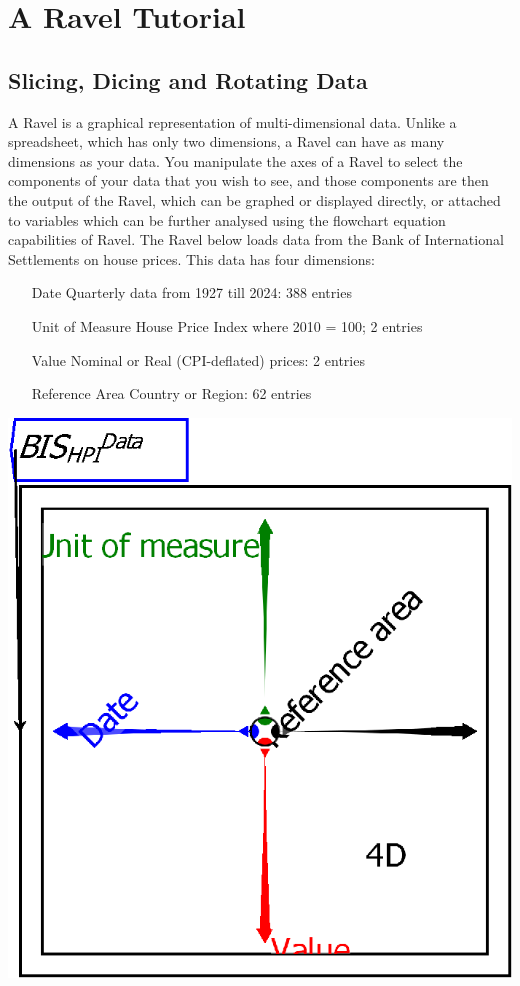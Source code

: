 \chapter{A Ravel Tutorial}\label{tutorial}

\section{Slicing, Dicing and Rotating Data}

A Ravel is a graphical representation of multi-dimensional data. Unlike a spreadsheet, which has only two dimensions, a Ravel can have as many dimensions as your data. You manipulate the axes of a Ravel to select the components of your data that you wish to see, and those components are then the output of the Ravel, which can be graphed or displayed directly, or attached to variables which can be further analysed using the flowchart equation capabilities of Ravel. The Ravel below loads data from the Bank of International Settlements on house prices. This data has four dimensions:

\begin{enumerate}
\item[Date] Quarterly data from 1927 till 2024: 388 entries
\item[Unit of Measure] House Price Index where 2010 = 100; 2 entries
\item[Value] Nominal or Real (CPI-deflated) prices: 2 entries
\item[Reference Area] Country or Region: 62 entries
\end{enumerate}

\includegraphics{images/tut00Ravel.eps}

